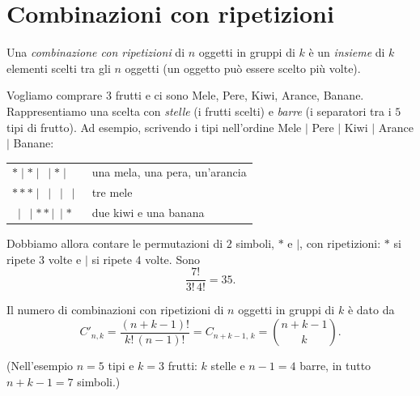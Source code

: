 \documentclass[11pt,a4paper]{article}
\begin{document}
\section{Combinazioni con ripetizioni}

\begin{definizione}
Una \emph{combinazione con ripetizioni} di $n$ oggetti in gruppi di $k$ è un \emph{insieme} di $k$ elementi scelti tra gli $n$ oggetti (un oggetto può essere scelto più volte).
\end{definizione}

\begin{esempio}[Frutta]
Vogliamo comprare $3$ frutti e ci sono Mele, Pere, Kiwi, Arance, Banane. Rappresentiamo una scelta con \emph{stelle} (i frutti scelti) e \emph{barre} (i separatori tra i $5$ tipi di frutto). Ad esempio, scrivendo i tipi nell'ordine Mele $|$ Pere $|$ Kiwi $|$ Arance $|$ Banane:
\begin{center}
\begin{tabular}{@{}ll@{}}
$\ast \mid \ast \mid\ \mid \ast \mid\ $ & una mela, una pera, un'arancia \\
$\ast\ast\ast \mid\ \mid\ \mid\ \mid\ $ & tre mele \\
$\ \mid\ \mid \ast\ast \mid\ \mid \ast$ & due kiwi e una banana
\end{tabular}
\end{center}
Dobbiamo allora contare le permutazioni di $2$ simboli, $\ast$ e $\mid$, con ripetizioni: $\ast$ si ripete $3$ volte e $\mid$ si ripete $4$ volte. Sono
\[
\frac{7!}{3!\,4!} = 35 .
\]
\end{esempio}

\begin{proposizione}
Il numero di combinazioni con ripetizioni di $n$ oggetti in gruppi di $k$ è dato da
\[
C'_{n,k} = \frac{(n+k-1)!}{k!\,(n-1)!} = C_{n+k-1,\,k} = \binom{n+k-1}{k} .
\]
\end{proposizione}

(Nell'esempio $n = 5$ tipi e $k = 3$ frutti: $k$ stelle e $n - 1 = 4$ barre, in tutto $n + k - 1 = 7$ simboli.)
\end{document}
